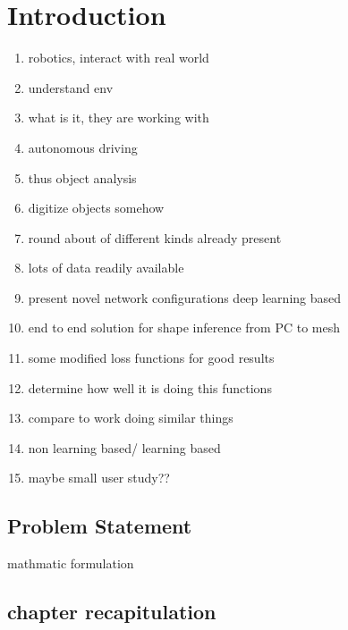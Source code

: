 
\chapter{Introduction}


\begin{enumerate}
    \item robotics, interact with real world
    \item understand env
    \item what is it, they are working with
    \item autonomous driving 
    \item thus object analysis 
    \item digitize objects somehow
    \item round about of different kinds already present
    \item lots of data readily available
    \item present novel network configurations deep learning based
    \item end to end solution for shape inference from PC to mesh
    \item some modified loss functions for good results
    \item determine how well it is doing this functions
    \item compare to work doing similar things
    \item non learning based/ learning based
    \item maybe small user study??
  \end{enumerate}
\section{Problem Statement}
mathmatic formulation
\section{chapter recapitulation}